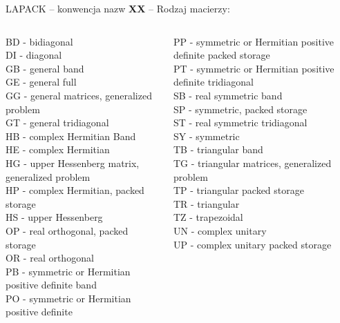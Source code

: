 	\begin{frame}{LAPACK -- konwencja nazw}
	\textbf{XX} -- Rodzaj macierzy:
	\vspace{5mm}
	\begin{columns}
		\begin{column}{0.5\textwidth}
		\scriptsize
	BD - bidiagonal \\
	DI - diagonal \\
	GB - general band \\
	GE - general full \\
	GG - general matrices, generalized problem \\
	GT - general tridiagonal \\
	HB - complex Hermitian Band \\
	HE - complex Hermitian \\
	HG - upper Hessenberg matrix, generalized problem \\
	HP - complex Hermitian, packed storage \\
	HS - upper Hessenberg \\
	OP - real orthogonal, packed storage \\
	OR - real orthogonal \\
	PB - symmetric or Hermitian positive definite band \\
	PO - symmetric or Hermitian positive definite \\
	\end{column}
	\begin{column}{0.5\textwidth}
	\scriptsize
	PP - symmetric or Hermitian positive definite packed storage \\
	PT - symmetric or Hermitian positive definite tridiagonal \\
	SB - real symmetric band \\
	SP - symmetric, packed storage \\
	ST - real symmetric tridiagonal \\
	SY - symmetric \\
	TB - triangular band \\
	TG - triangular matrices, generalized problem \\
	TP - triangular packed storage \\
	TR - triangular \\
	TZ - trapezoidal \\
	UN - complex unitary \\
	UP - complex unitary packed storage \\
		\end{column}
	\end{columns}
	\end{frame}
